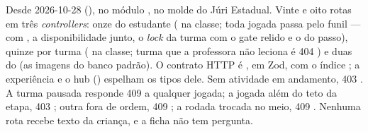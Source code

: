 Desde 2026-10-28 (), no módulo , no molde do
Júri Estadual. Vinte e oito rotas em três \emph{controllers}: onze do
estudante ( na classe; toda jogada passa pelo funil
 ---  com , a
disponibilidade junto, o \emph{lock} da turma com o gate relido e o
 do passo), quinze por turma ( na classe; turma que a professora não leciona é 404
) e duas do  (as imagens do banco padrão).
O contrato HTTP é , em Zod, com o índice
; a experiência e o hub () espelham os
tipos dele. Sem atividade em andamento, 403 . A
turma pausada responde 409  a qualquer jogada; a jogada além
do teto da etapa, 403 ; outra fora de ordem, 409
; a rodada trocada no meio, 409 .
Nenhuma rota recebe texto da criança, e a ficha não tem pergunta.

